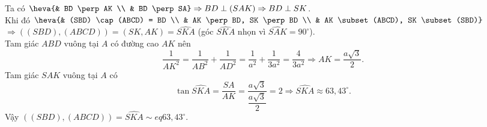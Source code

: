 \begin{ex}
{\begin{itemchoice}
			Ta có $\heva{& BD \perp AK \\ & BD \perp SA} \Rightarrow BD \perp (SAK) \Rightarrow BD \perp SK$.\\ 
			Khi đó $\heva{& (SBD) \cap (ABCD) = BD \\ & AK \perp BD, SK \perp BD \\ & AK \subset (ABCD),  SK \subset (SBD)}$\\
			$\Rightarrow \left((SBD),(ABCD)\right) = (SK, AK) = \widehat{SKA}$ (góc $\widehat{SKA}$  nhọn vì $\widehat{SAK}=90^\circ$).\\
			Tam giác $ABD$ vuông tại $A$ có đường cao $AK$ nên 
			$$\dfrac{1}{AK^2}=\dfrac{1}{AB^2}+\dfrac{1}{AD^2}=\dfrac{1}{a^2}+\dfrac{1}{3 a^2}=\dfrac{4}{3 a^2} \Rightarrow AK=\dfrac{a  \sqrt{3}}{2}.$$
			Tam giác $SAK$ vuông  tại $A$ có
			$$\tan \widehat{SKA}=\dfrac{SA}{AK}=\dfrac{a \sqrt{3}}{\dfrac{a  \sqrt{3}}{2}}=2 \Rightarrow \widehat{S K A} \approx 63{,}43^{\circ}.$$
			Vậy $\left((SBD),(ABCD)\right)=\widehat{SKA} \sim eq  63{,}43^{\circ}$.
		\end{itemchoice}
	 }
\end{ex}

